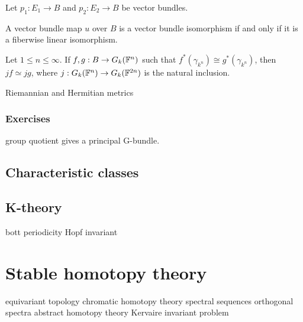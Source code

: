 \documentclass{../../large}
\begin{document}
\begin{prb}
Let $p_1:E_1\to B$ and $p_2:E_2\to B$ be vector bundles.
\begin{parts}
\item A vector bundle map $u$ over $B$ is a vector bundle isomorphism if and only if it is a fiberwise linear isomorphism.
\end{parts}
\end{prb}



Let $1\le n\le\infty$.
If $f,g:B\to G_k(\mathbb{F}^n)$ such that $f^*(\gamma_{k^n})\cong g^*(\gamma_{k^n})$, then $jf\simeq jg$, where $j:G_k(\mathbb{F}^n)\to G_k(\mathbb{F}^{2n})$ is the natural inclusion.


\begin{prb}
Riemannian and Hermitian metrics
\end{prb}

\section*{Exercises}

group quotient gives a principal G-bundle.







\chapter{Characteristic classes}


\chapter{K-theory}

bott periodicity
Hopf invariant





\part{Stable homotopy theory}
equivariant topology
chromatic homotopy theory
spectral sequences
orthogonal spectra
abstract homotopy theory
Kervaire invariant problem
\end{document}
